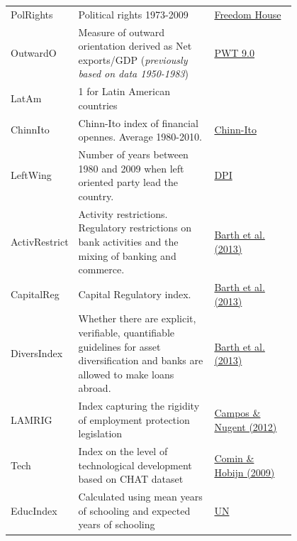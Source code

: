\documentclass[a4paper,11pt]{article}
\begin{document}
\begin{center}
\begin{longtable}{l p{0.50\linewidth} p{0.3\linewidth}}
  PolRights & Political rights 1973-2009 & \href{https://freedomhouse.org/report/freedom-world-2016/methodology}{Freedom House} \\
  
  OutwardO & Measure of outward orientation derived as Net exports/GDP (\textit{previously based on data 1950-1983}) & \href{http://www.rug.nl/research/ggdc/data/pwt/pwt-9.0}{PWT 9.0} \\
  
  LatAm & 1 for Latin American countries & \\
  
  ChinnIto & Chinn-Ito index of financial opennes. Average 1980-2010. & \href{http://web.pdx.edu/~ito/Chinn-Ito_website.htm}{Chinn-Ito} \\ 

  LeftWing & Number of years between 1980 and 2009 when left oriented party lead the country. & \href{http://www.nsd.uib.no/macrodataguide/set.html?id=11&sub=1}{DPI} \\
  
  ActivRestrict & Activity restrictions. Regulatory restrictions on bank activities and the mixing of banking and commerce. & \href{http://faculty.haas.berkeley.edu/ross_levine/regulation.htm}{Barth et al. (2013)} \\
  
  CapitalReg & Capital Regulatory index. & \href{http://faculty.haas.berkeley.edu/ross_levine/regulation.htm}{Barth et al. (2013)} \\
  
  DiversIndex & Whether there are explicit, verifiable, quantifiable guidelines for asset diversification and banks are allowed to make loans abroad. & \href{http://faculty.haas.berkeley.edu/ross_levine/regulation.htm}{Barth et al. (2013)} \\
  
  LAMRIG & Index capturing the rigidity of employment protection legislation & \href{https://www.iza.org/publications/dp/6881}{Campos \& Nugent (2012)} \\

  Tech & Index on the level of technological development based on CHAT dataset & \href{http://www.nber.org/data/chat/}{Comin \& Hobijn (2009)} \\

  EducIndex & Calculated using mean years of schooling and expected years of schooling & \href{http://hdr.undp.org/en/content/education-index}{UN} \\


\end{longtable}
\end{center}
\end{document}
